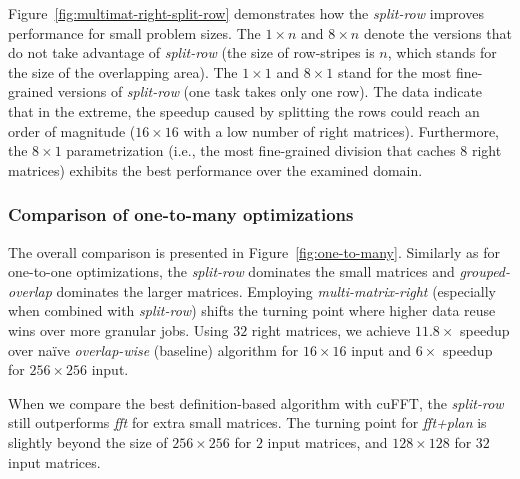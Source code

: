 Figure~\ref{fig:multimat-right-split-row} demonstrates how the \emph{split-row} improves performance for small problem sizes. The $1\times n$ and $8\times n$ denote the versions that do not take advantage of \emph{split-row} (the size of row-stripes is $n$, which stands for the size of the overlapping area). The $1\times 1$ and $8\times 1$ stand for the most fine-grained versions of \emph{split-row} (one task takes only one row). The data indicate that in the extreme, the speedup caused by splitting the rows could reach an order of magnitude ($16\times16$ with a low number of right matrices). Furthermore, the $8\times 1$ parametrization (i.e., the most fine-grained division that caches $8$ right matrices) exhibits the best performance over the examined domain.

\subsubsection{Comparison of one-to-many optimizations}

The overall comparison is presented in Figure~\ref{fig:one-to-many}. Similarly as for one-to-one optimizations, the \emph{split-row} dominates the small matrices and \emph{grouped-overlap} dominates the larger matrices. Employing \emph{multi-matrix-right} (especially when combined with \emph{split-row}) shifts the turning point where higher data reuse wins over more granular jobs. Using $32$ right matrices, we achieve $11.8\times$ speedup over na\"{i}ve \emph{overlap-wise} (baseline) algorithm for $16\times 16$ input and $6\times$ speedup for $256\times 256$ input.

When we compare the best definition-based algorithm with cuFFT, the \emph{split-row} still outperforms \emph{fft} for extra small matrices. The turning point for \emph{fft+plan} is slightly beyond the size of $256\times 256$ for $2$ input matrices, and $128\times 128$ for $32$ input matrices.

